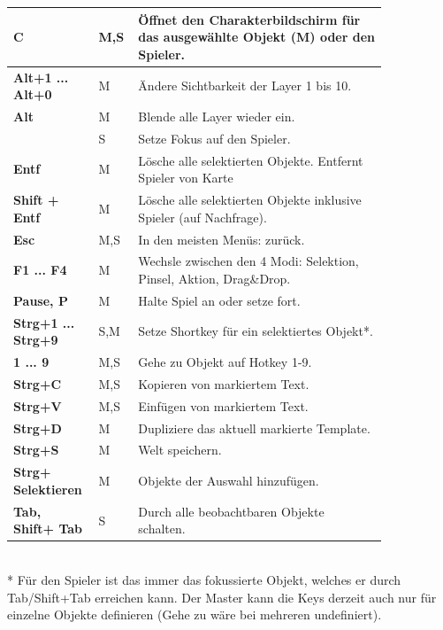 \documentclass[german,10pt,a4paper,twocolumn,colorscheme=darkblue]{orarticle}
\begin{document}
		\begin{supertabular}{p{0.15\linewidth}|p{0.075\linewidth}|p{0.62\linewidth}}
			\textbf{C}               & M,S & Öffnet den Charakterbildschirm für das ausgewählte Objekt (M) oder den Spieler. \\\hline
			\textbf{Alt+1 ... Alt+0} & M & Ändere Sichtbarkeit der Layer 1 bis 10. \\\hline
			\textbf{Alt}             & M & Blende alle Layer wieder ein.\\
			                         & S & Setze Fokus auf den Spieler.\\\hline
			\textbf{Entf}			 & M & Lösche alle selektierten Objekte. Entfernt Spieler von Karte\\\hline
			\textbf{Shift + Entf}	 & M & Lösche alle selektierten Objekte inklusive Spieler (auf Nachfrage).\\\hline
			\textbf{Esc}			 & M,S & In den meisten Menüs: zurück.\\\hline
			\textbf{F1 ... F4}		 & M & Wechsle zwischen den 4 Modi: Selektion, Pinsel, Aktion, Drag\&Drop.\\\hline
			\textbf{Pause, P}		 & M & Halte Spiel an oder setze fort.\\\hline
			\textbf{Strg+1 ... Strg+9}& S,M & Setze Shortkey für ein selektiertes Objekt*.\\\hline
			\textbf{1 ... 9}		 & M,S & Gehe zu Objekt auf Hotkey 1-9.\\\hline
			\textbf{Strg+C}			 & M,S & Kopieren von markiertem Text.\\\hline
			\textbf{Strg+V}			 & M,S & Einfügen von markiertem Text.\\\hline
			\textbf{Strg+D}			 & M & Dupliziere das aktuell markierte Template.\\\hline
			\textbf{Strg+S}			 & M & Welt speichern.\\\hline
			\textbf{Strg+ Selektieren}& M & Objekte der Auswahl hinzufügen.\\\hline
			\textbf{Tab, Shift+ Tab}	 & S & Durch alle beobachtbaren Objekte schalten.\cr
		\end{supertabular}\\
	
		* Für den Spieler ist das immer das fokussierte Objekt, welches er durch Tab/Shift+Tab erreichen kann. Der Master kann die Keys derzeit auch nur für einzelne Objekte definieren (Gehe zu wäre bei mehreren undefiniert).
	
\end{document}

